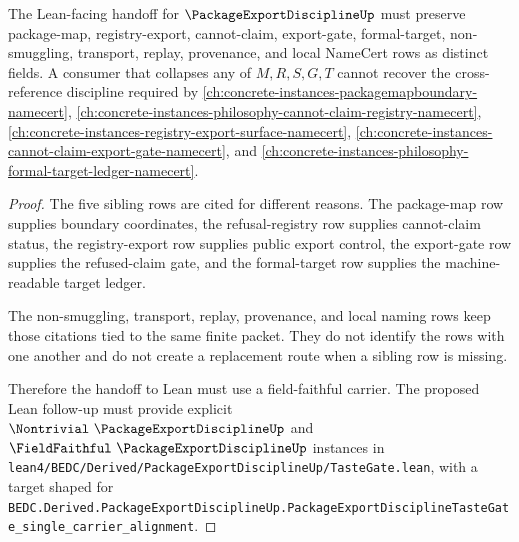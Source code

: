 \begin{theorem}
\label{thm:package-export-discipline-cross-reference-handoff}
The Lean-facing handoff for $\PackageExportDisciplineUp$ must preserve package-map, registry-export, cannot-claim, export-gate, formal-target, non-smuggling, transport, replay, provenance, and local NameCert rows as distinct fields. A consumer that collapses any of $M,R,S,G,T$ cannot recover the cross-reference discipline required by \autoref{ch:concrete-instances-packagemapboundary-namecert}, \autoref{ch:concrete-instances-philosophy-cannot-claim-registry-namecert}, \autoref{ch:concrete-instances-registry-export-surface-namecert}, \autoref{ch:concrete-instances-cannot-claim-export-gate-namecert}, and \autoref{ch:concrete-instances-philosophy-formal-target-ledger-namecert}.
\end{theorem}
\begin{proof}
The five sibling rows are cited for different reasons. The package-map row supplies boundary coordinates, the refusal-registry row supplies cannot-claim status, the registry-export row supplies public export control, the export-gate row supplies the refused-claim gate, and the formal-target row supplies the machine-readable target ledger.

The non-smuggling, transport, replay, provenance, and local naming rows keep those citations tied to the same finite packet. They do not identify the rows with one another and do not create a replacement route when a sibling row is missing.

Therefore the handoff to Lean must use a field-faithful carrier. The proposed Lean follow-up must provide explicit $\Nontrivial\ \PackageExportDisciplineUp$ and $\FieldFaithful\ \PackageExportDisciplineUp$ instances in \texttt{lean4/BEDC/Derived/PackageExportDisciplineUp/TasteGate.lean}, with a target shaped for \texttt{BEDC.Derived.PackageExportDisciplineUp.PackageExportDisciplineTasteGate\_single\_carrier\_alignment}.
\end{proof}

